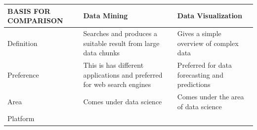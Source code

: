\documentclass[]{book}
\theoremstyle{definition}
\theoremstyle{definition}
\theoremstyle{definition}
\theoremstyle{remark}
\begin{document}
\begin{longtable}[]{@{}lll@{}}
\toprule
\begin{minipage}[b]{0.08\columnwidth}\raggedright\strut
\textbf{BASIS FOR COMPARISON}\strut
\end{minipage} & \begin{minipage}[b]{0.41\columnwidth}\raggedright\strut
\textbf{Data Mining}\strut
\end{minipage} & \begin{minipage}[b]{0.41\columnwidth}\raggedright\strut
\textbf{Data Visualization}\strut
\end{minipage}\tabularnewline
\midrule
\endhead
\begin{minipage}[t]{0.08\columnwidth}\raggedright\strut
Definition\strut
\end{minipage} & \begin{minipage}[t]{0.41\columnwidth}\raggedright\strut
Searches and produces a suitable result from large data chunks\strut
\end{minipage} & \begin{minipage}[t]{0.41\columnwidth}\raggedright\strut
Gives a simple overview of complex data\strut
\end{minipage}\tabularnewline
\begin{minipage}[t]{0.08\columnwidth}\raggedright\strut
Preference\strut
\end{minipage} & \begin{minipage}[t]{0.41\columnwidth}\raggedright\strut
This is has different applications and preferred for web search
engines\strut
\end{minipage} & \begin{minipage}[t]{0.41\columnwidth}\raggedright\strut
Preferred for data forecasting and predictions\strut
\end{minipage}\tabularnewline
\begin{minipage}[t]{0.08\columnwidth}\raggedright\strut
Area\strut
\end{minipage} & \begin{minipage}[t]{0.41\columnwidth}\raggedright\strut
Comes under data science\strut
\end{minipage} & \begin{minipage}[t]{0.41\columnwidth}\raggedright\strut
Comes under the area of data science\strut
\end{minipage}\tabularnewline
\begin{minipage}[t]{0.08\columnwidth}\raggedright\strut
Platform\strut
\end{minipage} & \begin{minipage}[t]{0.41\columnwidth}\raggedright\strut

\end{minipage}
\end{longtable}
\end{document}
